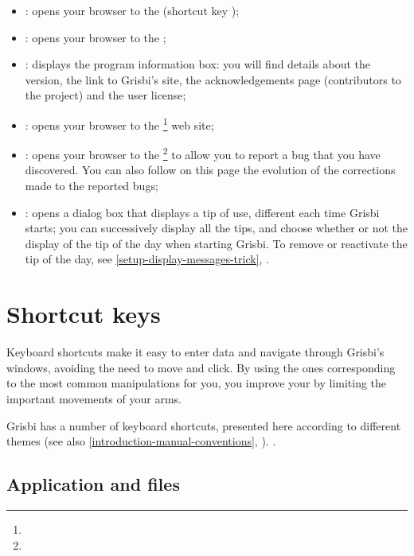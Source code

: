 \begin{itemize}
	\item {}: opens your browser to the   (shortcut key  );
	\item {}: opens your browser to the  ;
	\item {}: displays the program information box: you will find details about the version, the link to Grisbi's site, the acknowledgements page (contributors to the project) and the user license;
	\item {}: opens your browser to the \footnote{\urlGrisbi{}} web site;
	\item {}: opens your browser to the \footnote{\urlBugTracker{}} to allow you to report a bug that you have discovered. You can also follow on this page the evolution of the corrections made to the reported bugs;
	\item {}: opens a dialog box that displays a tip of use, different each time Grisbi starts; you can successively display all the tips, and choose whether or not the display of the tip of the day when starting Grisbi. To remove or reactivate the tip of the day, see \vref{setup-display-messages-trick}, .
\end{itemize}


\section{Shortcut keys\label{home-shortcuts}}


Keyboard shortcuts make it easy to enter data and navigate through Grisbi's windows, avoiding the need to move and click. By using the ones corresponding to the most common manipulations for you, you improve your  by limiting the important movements of your arms.
 
Grisbi has a number of keyboard shortcuts, presented here according to different themes (see also  \vref{introduction-manual-conventions}, ).
.

\subsection{Application and files}

